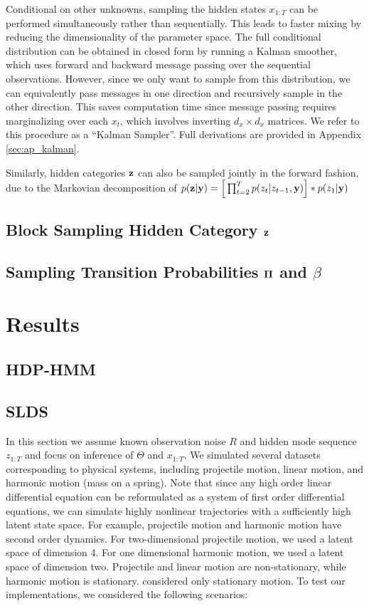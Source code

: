 \documentclass{article} %
\begin{document}
Conditional on other unknowns, sampling the hidden states $x_{1:T}$ can be performed simultaneously rather than sequentially. This leads to faster mixing by reducing the dimensionality of the parameter space. The full conditional distribution can be obtained in closed form by running a Kalman smoother, which uses forward and backward message passing over the sequential observations. However, since we only want to sample from this distribution, we can equivalently pass messages in one direction and recursively sample in the other direction. This saves computation time since message passing requires marginalizing over each $x_t$, which involves inverting $d_x\times d_x$ matrices. We refer to this procedure as a ``Kalman Sampler''. Full derivations are provided in Appendix \ref{sec:ap_kalman}.

Similarly, hidden categories ${\bf z}$ can also be sampled jointly in the forward fashion, due to the Markovian decomposition of $p({\bf z} | {\bf y}) = \Big[ \prod_{t=2}^T p(z_t| z_{t-1}, {\bf y}) \Big] * p(z_1|{\bf y})$


\subsection{Block Sampling Hidden Category ${\bf z}$}

\subsection{Sampling Transition Probabilities $\boldsymbol{\Pi}$ and $\beta$}


\section{Results}

\subsection{HDP-HMM}

\subsection{SLDS}

In this section we assume known observation noise $R$ and hidden mode sequence $z_{1:T}$ and focus on inference of $\Theta$ and $x_{1:T}$. We simulated several datasets corresponding to physical systems, including projectile motion, linear motion, and harmonic motion (mass on a spring). Note that since any high order linear differential equation can be reformulated as a system of first order differential equations, we can simulate highly nonlinear trajectories with a sufficiently high latent state space. For example, projectile motion and harmonic motion have second order dynamics. For two-dimensional projectile motion, we used a latent space of dimension 4. For one dimensional harmonic motion, we used a latent space of dimension two. Projectile and linear motion are non-stationary, while harmonic motion is stationary. \cite{fox_bayesian_2009} considered only stationary motion. To test our implementations, we considered the following scenarios:
\end{document}
